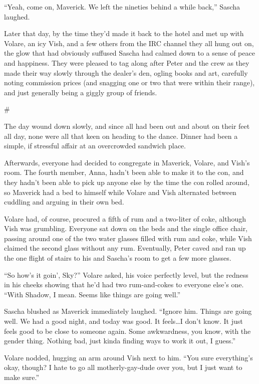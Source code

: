 \documentclass[12pt,letterpaper,oneside]{memoir}
\newcommand\secdiv{
  \begin{center}
    \#
  \end{center}
}
\begin{document}
  ``Yeah, come on, Maverick. We left the nineties behind a while back,'' Sascha laughed.

  Later that day, by the time they'd made it back to the hotel and met up with Volare, an icy Vish, and a few others from the IRC channel they all hung out on, the glow that had obviously suffused Sascha had calmed down to a sense of peace and happiness. They were pleased to tag along after Peter and the crew as they made their way slowly through the dealer's den, ogling books and art, carefully noting commission prices (and snagging one or two that were within their range), and just generally being a giggly group of friends.

  \secdiv

  The day wound down slowly, and since all had been out and about on their feet all day, none were all that keen on heading to the dance. Dinner had been a simple, if stressful affair at an overcrowded sandwich place.

  Afterwards, everyone had decided to congregate in Maverick, Volare, and Vish's room. The fourth member, Anna, hadn't been able to make it to the con, and they hadn't been able to pick up anyone else by the time the con rolled around, so Maverick had a bed to himself while Volare and Vish alternated between cuddling and arguing in their own bed.

  Volare had, of course, procured a fifth of rum and a two-liter of coke, although Vish was grumbling. Everyone sat down on the beds and the single office chair, passing around one of the two water glasses filled with rum and coke, while Vish claimed the second glass without any rum. Eventually, Peter caved and ran up the one flight of stairs to his and Sascha's room to get a few more glasses.

  ``So how's it goin', Sky?'' Volare asked, his voice perfectly level, but the redness in his cheeks showing that he'd had two rum-and-cokes to everyone else's one. ``With Shadow, I mean. Seems like things are going well.''

  Sascha blushed as Maverick immediately laughed. ``Ignore him. Things are going well. We had a good night, and today was good. It feels\ldots{}I don't know. It just feels good to be close to someone again. Some awkwardness, you know, with the gender thing. Nothing bad, just kinda finding ways to work it out, I guess.''

  Volare nodded, hugging an arm around Vish next to him. ``You sure everything's okay, though? I hate to go all motherly-gay-dude over you, but I just want to make sure.''
\end{document}
